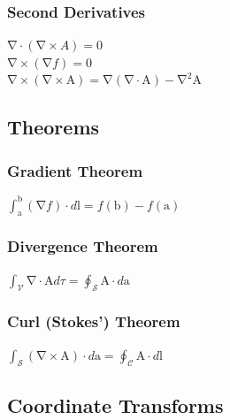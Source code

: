 \documentclass[10pt,landscape,letterpaper]{cheatsheet}
\newcommand{\bv}[1]{\bm{\mathrm{#1}}}
\newcommand{\grad}{\bv{\nabla}}
\renewcommand{\div}[1]{\grad\cdot #1}
\newcommand{\curl}[1]{\grad\times #1}
\begin{document}
\subsubsection*{Second Derivatives}
$\div{(\curl{A})}=0$\\
$\curl{(\grad f)}=0$\\
$\curl{(\curl{\bv{A}})}=\grad(\div{\bv{A}})-\grad^2\bv{A}$
\subsection*{Theorems}
\subsubsection*{Gradient Theorem}
$\int_{\bv{a}}^{\bv{b}}(\grad f)\cdot d\bv{l}=f(\bv{b})-f(\bv{a})$
\subsubsection*{Divergence Theorem}
$\int_\mathcal{V}\grad\cdot \bv{A}d\tau=\oint_\mathcal{S}\bv{A}\cdot d\bv{a}$
\subsubsection*{Curl (Stokes') Theorem}
$\int_\mathcal{S}(\grad\times \bv{A})\cdot d\bv{a}=\oint_\mathcal{C}\bv{A}\cdot d\bv{l}$
\subsection*{Coordinate Transforms}
\end{document}
